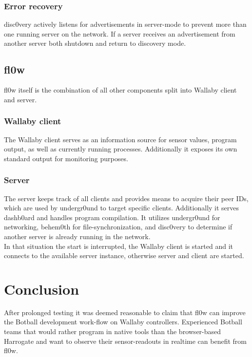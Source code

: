 \documentclass[conference,a4paper]{IEEEtran}
\begin{document}
\subsubsection{Error recovery}
disc0very\cite{disc0very:Christoph Heiss} actively listens for advertisements in server-mode to prevent more than one running server on the network. If a server receives an advertisement from another server both shutdown and return to discovery mode.


\subsection{fl0w}
fl0w\cite{fl0w:Philip Trauner} itself is the combination of all other components split into Wallaby\cite{Wallaby Controller:KIPR} client and server.\\

\subsubsection{Wallaby client}
The Wallaby\cite{Wallaby Controller:KIPR} client serves as an information source for sensor values, program output, as well as currently running processes. Additionally it exposes its own standard output for monitoring purposes.\\

\subsubsection{Server}
The server keeps track of all clients and provides means to acquire their peer IDs, which are used by undergr0und to target specific clients. Additionally it serves dashb0ard\cite{dashb0ard:Sebastian Schaffler} and handles program compilation. It utilizes undergr0und for networking, behem0th for file-synchronization, and disc0very\cite{disc0very:Christoph Heiss} to determine if another server is already running in the network. \\
In that situation the start is interrupted, the Wallaby\cite{Wallaby Controller:KIPR} client is started and it connects to the available server instance, otherwise server and client are started. \\

\section{Conclusion}
After prolonged testing it was deemed reasonable to claim that fl0w\cite{fl0w:Philip Trauner} can improve the Botball development work-flow on Wallaby\cite{Wallaby Controller:KIPR} controllers. Experienced Botball teams that would rather program in native tools than the browser-based Harrogate and want to observe their sensor-readouts in realtime can benefit from fl0w.
\end{document}
